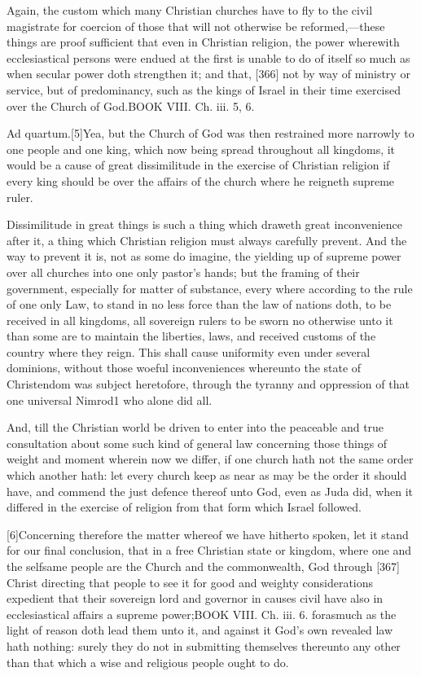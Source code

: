 Again, the custom which many Christian churches have to fly to the civil magistrate for coercion of those that will not otherwise be reformed,—these things are proof sufficient that even in Christian religion, the power wherewith ecclesiastical persons were endued at the first is unable to do of itself so much as when secular power doth strengthen it; and that, [366] not by way of ministry or service, but of predominancy, such as the kings of Israel in their time exercised over the Church of God.BOOK VIII. Ch. iii. 5, 6.

Ad quartum.[5]Yea, but the Church of God was then restrained more narrowly to one people and one king, which now being spread throughout all kingdoms, it would be a cause of great dissimilitude in the exercise of Christian religion if every king should be over the affairs of the church where he reigneth supreme ruler.

Dissimilitude in great things is such a thing which draweth great inconvenience after it, a thing which Christian religion must always carefully prevent. And the way to prevent it is, not as some do imagine, the yielding up of supreme power over all churches into one only pastor’s hands; but the framing of their government, especially for matter of substance, every where according to the rule of one only Law, to stand in no less force than the law of nations doth, to be received in all kingdoms, all sovereign rulers to be sworn no otherwise unto it than some are to maintain the liberties, laws, and received customs of the country where they reign. This shall cause uniformity even under several dominions, without those woeful inconveniences whereunto the state of Christendom was subject heretofore, through the tyranny and oppression of that one universal Nimrod1 who alone did all.

And, till the Christian world be driven to enter into the peaceable and true consultation about some such kind of general law concerning those things of weight and moment wherein now we differ, if one church hath not the same order which another hath: let every church keep as near as may be the order it should have, and commend the just defence thereof unto God, even as Juda did, when it differed in the exercise of religion from that form which Israel followed.

[6]Concerning therefore the matter whereof we have hitherto spoken, let it stand for our final conclusion, that in a free Christian state or kingdom, where one and the selfsame people are the Church and the commonwealth, God through [367] Christ directing that people to see it for good and weighty considerations expedient that their sovereign lord and governor in causes civil have also in ecclesiastical affairs a supreme power;BOOK VIII. Ch. iii. 6. forasmuch as the light of reason doth lead them unto it, and against it God’s own revealed law hath nothing: surely they do not in submitting themselves thereunto any other than that which a wise and religious people ought to do.

